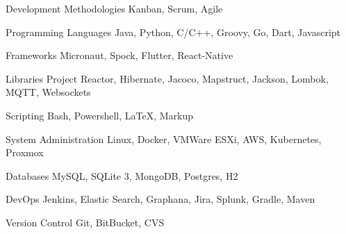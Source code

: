 
\begin{cvskills}

  \cvskill
    {Development Methodologies}
    {Kanban, Scrum, Agile}

  \cvskill
    {Programming Languages}
    {Java, Python, C/C++, Groovy, Go, Dart, Javascript}

  \cvskill
    {Frameworks}
    {Micronaut, Spock, Flutter, React-Native}

  \cvskill
    {Libraries}
    {Project Reactor, Hibernate, Jacoco, Mapstruct, Jackson, Lombok, MQTT, Websockets}
    
  \cvskill
    {Scripting}
    {Bash, Powershell, LaTeX, Markup}

  \cvskill
    {System Administration}
    {Linux, Docker, VMWare ESXi, AWS, Kubernetes, Proxmox}
    
  \cvskill
    {Databases}
    {MySQL, SQLite 3, MongoDB, Postgres, H2}
    
  \cvskill
    {DevOps}
    {Jenkins, Elastic Search, Graphana, Jira, Splunk, Gradle, Maven}

  \cvskill
    {Version Control}
    {Git, BitBucket, CVS}
    

\end{cvskills}
